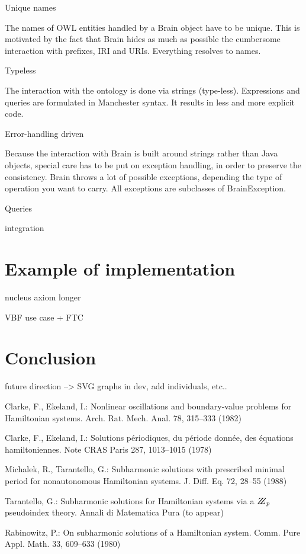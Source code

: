 \documentclass{llncs}
\begin{document}
Unique names

The names of OWL entities handled by a Brain object have to be unique. 
This is motivated by the fact that Brain hides as much as possible the cumbersome
 interaction with prefixes, IRI and URIs. Everything resolves to names.

Typeless

The interaction with the ontology is done via strings (type-less). 
Expressions and queries are formulated in Manchester syntax. It results 
in less and more explicit code.

Error-handling driven

Because the interaction with Brain is built around strings rather than Java objects, 
special care has to be put on exception handling, in order to preserve the consistency. Brain 
throws a lot of possible exceptions, depending the type of operation you want to carry. 
All exceptions are subclasses of BrainException.

Queries

integration

\section{Example of implementation}

nucleus axiom longer 

VBF use case + FTC

\section{Conclusion}

future direction --> SVG graphs in dev, add individuals, etc..


%
\begin{thebibliography}{5}
%
Clarke, F., Ekeland, I.:
Nonlinear oscillations and
boundary-value problems for Hamiltonian systems.
Arch. Rat. Mech. Anal. 78, 315--333 (1982)

Clarke, F., Ekeland, I.:
Solutions p\'{e}riodiques, du
p\'{e}riode donn\'{e}e, des \'{e}quations hamiltoniennes.
Note CRAS Paris 287, 1013--1015 (1978)

Michalek, R., Tarantello, G.:
Subharmonic solutions with prescribed minimal
period for nonautonomous Hamiltonian systems.
J. Diff. Eq. 72, 28--55 (1988)

Tarantello, G.:
Subharmonic solutions for Hamiltonian
systems via a $\bbbz_{p}$ pseudoindex theory.
Annali di Matematica Pura (to appear)

Rabinowitz, P.:
On subharmonic solutions of a Hamiltonian system.
Comm. Pure Appl. Math. 33, 609--633 (1980)

\end{thebibliography}
\end{document}
